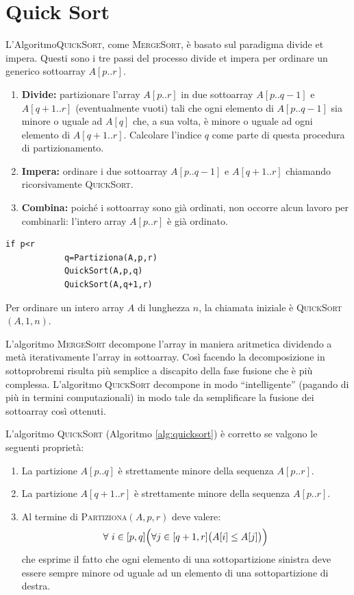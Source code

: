 \section{Quick Sort}
L'Algoritmo\textsc{QuickSort}, come \textsc{MergeSort}, è basato sul paradigma divide et impera. Questi sono i tre passi del processo divide et impera per ordinare un generico sottoarray $A[p..r]$.
\begin{enumerate}
	\item \textbf{Divide:} partizionare l'array $A[p..r]$ in due sottoarray $A[p..q-1]$ e $A[q+1..r]$ (eventualmente vuoti) tali che ogni elemento di $A[p..q-1]$ sia minore o uguale ad $A[q]$ che, a sua volta, è minore o uguale ad ogni elemento di $A[q+1..r]$. Calcolare l'indice $q$ come parte di questa procedura di partizionamento.
	\item \textbf{Impera:} ordinare i due sottoarray $A[p..q-1]$ e $A[q+1..r]$ chiamando ricorsivamente \textsc{QuickSort}.
	\item \textbf{Combina:} poiché i sottoarray sono già ordinati, non occorre alcun lavoro per combinarli: l'intero array $A[p..r]$ è già ordinato.
\end{enumerate}

\begin{lstlisting}[caption={\textsc{QuickSort}(A,p,r)},label={alg:quicksort},language=asd]
		if p<r
			q=Partiziona(A,p,r)
			QuickSort(A,p,q)
			QuickSort(A,q+1,r)
\end{lstlisting}
Per ordinare un intero array $A$ di lunghezza $n$, la chiamata iniziale è \textsc{QuickSort}$(A,1,n)$.

\begin{osservation}
	L'algoritmo \textsc{MergeSort} decompone l'array in maniera aritmetica dividendo a metà iterativamente l'array in sottoarray. Così facendo la decomposizione in sottoprobremi risulta più semplice a discapito della fase fusione che è più complessa. L'algoritmo \textsc{QuickSort} decompone in modo ``intelligente'' (pagando di più in termini computazionali) in modo tale da semplificare la fusione dei sottoarray così ottenuti.
\end{osservation}

L'algoritmo \textsc{QuickSort} (Algoritmo \ref{alg:quicksort}) è corretto se valgono le seguenti proprietà:
\begin{enumerate}
	\item La partizione $A[p..q]$ è strettamente minore della sequenza $A[p..r]$.
	\item La partizione $A[q+1..r]$ è strettamente minore della sequenza $A[p..r]$.
	\item Al termine di \textsc{Partiziona}$(A,p,r)$ deve valere:
	\begin{displaymath}
		\forall \ i \in [p,q] \Bigl( \forall j \in [q+1,r] \bigl( A[i] \leq A[j]\bigr)\Bigr)
	\end{displaymath}
che esprime il fatto che ogni elemento di una sottopartizione sinistra deve essere sempre minore od uguale ad un elemento di una sottopartizione di destra.
\end{enumerate}

